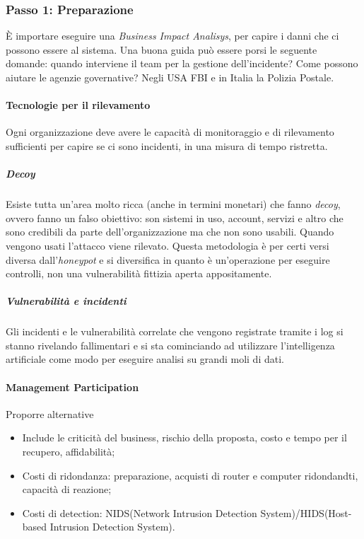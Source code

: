 \subsubsection{Passo 1: Preparazione}

È importare eseguire una \textit{Business Impact Analisys}, per capire i danni
che ci possono essere al sistema.
Una buona guida può essere porsi le seguente domande: quando interviene il team 
per la gestione dell'incidente? Come possono aiutare le agenzie governative? 
Negli USA FBI e in Italia la Polizia Postale.

\paragraph{Tecnologie per il rilevamento}

Ogni organizzazione deve avere le capacità di monitoraggio e di rilevamento
sufficienti per capire se ci sono incidenti, in una misura di tempo ristretta.

\subparagraph*{Decoy} Esiste tutta un'area molto ricca (anche in termini
monetari) che fanno \textit{decoy}, ovvero fanno un falso obiettivo: son sistemi
in uso, account, servizi e altro che sono credibili da parte dell'organizzazione
ma che non sono usabili. Quando vengono usati l'attacco viene rilevato. Questa 
metodologia è per certi versi diversa dall'\textit{honeypot} e si diversifica 
in quanto è un'operazione per eseguire controlli, non una vulnerabilità fittizia 
aperta appositamente.

\subparagraph*{Vulnerabilità e incidenti} Gli incidenti e le vulnerabilità
correlate che vengono registrate tramite i log si stanno rivelando fallimentari 
e si sta cominciando ad utilizzare l'intelligenza artificiale come modo per eseguire
analisi su grandi moli di dati.

\paragraph*{Management Participation}

Proporre alternative
\begin{itemize}
\item Include le criticità del business, rischio della proposta, costo e tempo
per il recupero, affidabilità;
\item Costi di ridondanza: preparazione, acquisti di router e computer ridondandti, 
capacità di reazione;
\item Costi di detection: NIDS(Network Intrusion Detection System)/HIDS(Host-based 
Intrusion Detection System).
\end{itemize}

